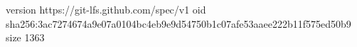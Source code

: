 version https://git-lfs.github.com/spec/v1
oid sha256:3ac7274674a9e07a0104bc4eb9e9d54750b1c07afe53aaee222b11f575ed50b9
size 1363
